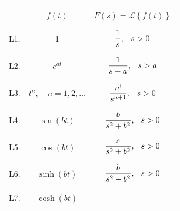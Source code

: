 \documentclass[12pt]{article}
\newcommand{\ds}{\displaystyle}
\newcommand\laplacesym{\mathscr{L}}
\newcommand\lap[1]{\laplacesym\left\{#1\right\}}
\begin{document}
\begin{center}
	 \hspace{0.25cm}

	{\setlength{\extrarowheight}{-0.3cm}
	\begin{tabular}{|c|c|c|}
        \hline
        &&\\
                & $f(t)$                                 
                & $F(s) = \lap{ f(t) }$ \\
        &&\\
        \hline\hline
        &&\\
        L1.     & 1                                        
                & $\ds \frac{1}{s},  \hspace{0.25cm}s>0$\\
		&&\\
        \hline
		&&\\
        L2.     & $e^{at}$                                
                & $\ds \frac{1}{s-a},  \hspace{0.25cm}s>a$\\
		&&\\
        \hline
		&&\\
        L3.     & $t^n,\quad n = 1, 2, \ldots$        	
                & $\ds \frac{n!}{s^{n+1}},  \hspace{0.25cm}s>0$\\
		&&\\
        \hline
		&&\\
        L4.	    & $\sin (bt)$                        	
                & $\ds \frac{b}{s^2 + b^2},  \hspace{0.25cm}s>0$\\
		&&\\
        \hline
		&&\\
        L5.	    & $\cos(bt)$                        	
                & $\ds \frac{s}{s^2 + b^2},  \hspace{0.25cm}s>0$\\
		&&\\
        \hline
		&&\\
        L6.	    & $\sinh (bt)$                        	
                & $\ds \frac{b}{s^2 - b^2},  \hspace{0.25cm}s>0$\\
		&&\\
        \hline
		&&\\
        L7.	    & $\cosh(bt)$                        	

\end{tabular}}
\end{center}
\end{document}
